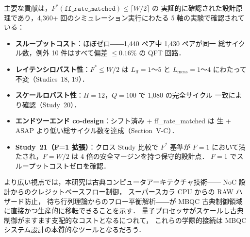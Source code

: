 \documentclass[journal,10pt,twocolumn]{IEEEtran}
\begin{document}
主要な貢献は，$F^*(\texttt{ff\_rate\_matched}) \leq \lceil W/2 \rceil$ の
実証的に確認された設計原理であり，4,360+ 回のシミュレーション実行にわたる
5 軸の実験で確認されている：

\begin{itemize}
\item \textbf{スループットコスト}：ほぼゼロ――1,440 ペア中 1,430 ペアが同一
  総サイクル数，例外 10 件はすべて偏差 $\leq 0.16\%$ の QFT 回路．
\item \textbf{レイテンシロバスト性}：$F^* \leq W/2$ は $L_{\mathrm{ff}} = 1$〜$5$
  と $L_{\mathrm{meas}} = 1$〜$4$ にわたって不変（Studies~18, 19）．
\item \textbf{スケールロバスト性}：$H=12$，$Q=100$ で 1,080 の完全サイクル
  一致により確認（Study~20）．
\item \textbf{エンドツーエンド co-design}：シフト済み + ff\_rate\_matched は
  生 + ASAP より低い総サイクル数を達成（Section~V-C）．
\item \textbf{Study~21（F=1 拡張）}：クロス Study 比較で $F^*$ 基準が $F=1$
  において満たされ，$F=W/2$ は 4 倍の安全マージンを持つ保守的設計点．
  $F=1$ でスループットコストゼロを確認．
\end{itemize}

より広い視点では，本研究は古典コンピュータアーキテクチャ技術――
NoC 設計からのクレジットベースフロー制御，
スーパースカラ CPU からの RAW ハザード防止，
待ち行列理論からのフロー平衡解析――が
MBQC 古典制御領域に直接かつ生産的に移転できることを示す．
量子プロセッサがスケールし古典制御がますます支配的なコストとなるにつれて，
これらの学際的接続は MBQC システム設計の本質的なツールとなるだろう．
\end{document}
